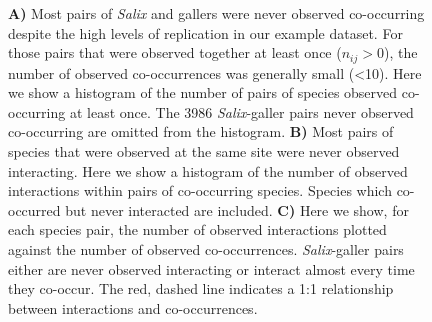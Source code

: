 \documentclass[12pt]{article}
\begin{document}
      \begin{figure}[h!]
          \caption{\textbf{A)} Most pairs of \emph{Salix} and gallers were never observed co-occurring despite the high levels of replication in our example dataset. For those pairs that were observed together at least once ($n_{ij}>0$), the number of observed co-occurrences was generally small (\textless10). Here we show a histogram of the number of pairs of species observed co-occurring at least once. The 3986 \emph{Salix}-galler pairs never observed co-occurring are omitted from the histogram. \textbf{B)} Most pairs of species that were observed at the same site were never observed interacting. Here we show a histogram of the number of observed interactions within pairs of co-occurring species. Species which co-occurred but never interacted are included. \textbf{C)} Here we show, for each species pair, the number of observed interactions plotted against the number of observed co-occurrences. \emph{Salix}-galler pairs either are never observed interacting or interact almost every time they co-occur. The red, dashed line indicates a 1:1 relationship between interactions and co-occurrences.}
          \label{histograms}
          \begin{center}

\end{center}
\end{figure}
\end{document}
